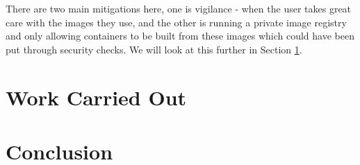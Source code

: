 \documentclass{article}
\begin{document}
There are two main mitigations here, one is vigilance - when the user takes great care with the images they use, and the other is running a private image registry and only allowing containers to be built from these images which could have been put through security checks. We will look at this further in Section \ref{sec:Work}.

\newpage
\section{Work Carried Out}
\label{sec:Work}

\newpage
\section{Conclusion}
\label{sec:Conclusion}

\newpage

\end{document}
